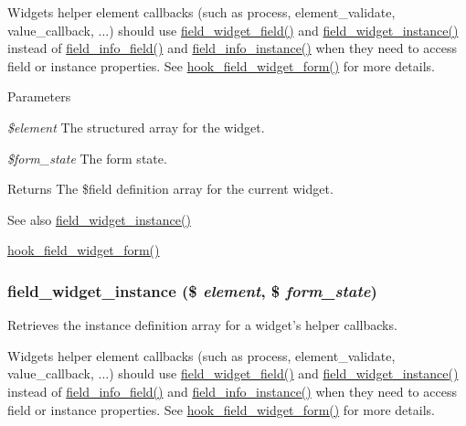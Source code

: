 Widgets helper element callbacks (such as process, element\_\-validate, value\_\-callback, ...) should use \hyperlink{field_8form_8inc_a71dcef632fc59641eee5238c7c6b335c}{field\_\-widget\_\-field()} and \hyperlink{field_8form_8inc_ac72e1f5dacbab488a337f79fe485429f}{field\_\-widget\_\-instance()} instead of \hyperlink{group__field__info_ga74cfc942cd2baa5c49780b08c5d357d4}{field\_\-info\_\-field()} and \hyperlink{group__field__info_ga7d4361ece7a9a8be980e3fd4a6307564}{field\_\-info\_\-instance()} when they need to access field or instance properties. See \hyperlink{group__field__widget_gaa9b0e55fd0eb57ac0f9c7c30d251971b}{hook\_\-field\_\-widget\_\-form()} for more details.


\begin{DoxyParams}{Parameters}
\item[{\em \$element}]The structured array for the widget. \item[{\em \$form\_\-state}]The form state.\end{DoxyParams}
\begin{DoxyReturn}{Returns}
The \$field definition array for the current widget.
\end{DoxyReturn}
\begin{DoxySeeAlso}{See also}
\hyperlink{field_8form_8inc_ac72e1f5dacbab488a337f79fe485429f}{field\_\-widget\_\-instance()} 

\hyperlink{group__field__widget_gaa9b0e55fd0eb57ac0f9c7c30d251971b}{hook\_\-field\_\-widget\_\-form()} 
\end{DoxySeeAlso}
\hypertarget{field_8form_8inc_ac72e1f5dacbab488a337f79fe485429f}{
\subsubsection[{field\_\-widget\_\-instance}]{\setlength{\rightskip}{0pt plus 5cm}field\_\-widget\_\-instance (\$ {\em element}, \/  \$ {\em form\_\-state})}}
\label{field_8form_8inc_ac72e1f5dacbab488a337f79fe485429f}
Retrieves the instance definition array for a widget's helper callbacks.

Widgets helper element callbacks (such as process, element\_\-validate, value\_\-callback, ...) should use \hyperlink{field_8form_8inc_a71dcef632fc59641eee5238c7c6b335c}{field\_\-widget\_\-field()} and \hyperlink{field_8form_8inc_ac72e1f5dacbab488a337f79fe485429f}{field\_\-widget\_\-instance()} instead of \hyperlink{group__field__info_ga74cfc942cd2baa5c49780b08c5d357d4}{field\_\-info\_\-field()} and \hyperlink{group__field__info_ga7d4361ece7a9a8be980e3fd4a6307564}{field\_\-info\_\-instance()} when they need to access field or instance properties. See \hyperlink{group__field__widget_gaa9b0e55fd0eb57ac0f9c7c30d251971b}{hook\_\-field\_\-widget\_\-form()} for more details.


